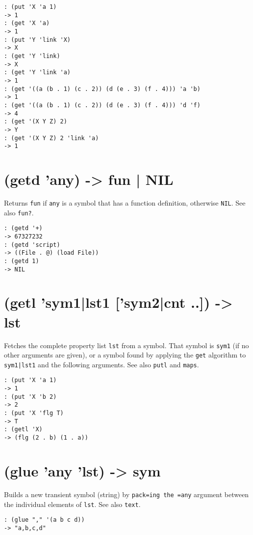 {{{{{{\begin{verbatim}
: (put 'X 'a 1)
-> 1
: (get 'X 'a)
-> 1
: (put 'Y 'link 'X)
-> X
: (get 'Y 'link)
-> X
: (get 'Y 'link 'a)
-> 1
: (get '((a (b . 1) (c . 2)) (d (e . 3) (f . 4))) 'a 'b)
-> 1
: (get '((a (b . 1) (c . 2)) (d (e . 3) (f . 4))) 'd 'f)
-> 4
: (get '(X Y Z) 2)
-> Y
: (get '(X Y Z) 2 'link 'a)
-> 1
\end{verbatim}

 
\section{(getd 'any) -> fun | NIL}
\label{sec-8-1-7-6}


Returns \texttt{fun} if \texttt{any} is a symbol that has a function definition,
otherwise \texttt{NIL}. See also \texttt{fun?}.


\begin{verbatim}
: (getd '+)
-> 67327232
: (getd 'script)
-> ((File . @) (load File))
: (getd 1)
-> NIL
\end{verbatim}

 
\section{(getl 'sym1|lst1 ['sym2|cnt ..]) -> lst}
\label{sec-8-1-7-7}


Fetches the complete property list \texttt{lst} from a symbol. That symbol is
\texttt{sym1} (if no other arguments are given), or a symbol found by applying
the \texttt{get} algorithm to \texttt{sym1|lst1} and the following arguments. See also
\texttt{putl} and \texttt{maps}.


\begin{verbatim}
: (put 'X 'a 1)
-> 1
: (put 'X 'b 2)
-> 2
: (put 'X 'flg T)
-> T
: (getl 'X)
-> (flg (2 . b) (1 . a))
\end{verbatim}

 
\section{(glue 'any 'lst) -> sym}
\label{sec-8-1-7-8}


Builds a new transient symbol (string) by \texttt{pack=ing the =any} argument
between the individual elements of \texttt{lst}. See also \texttt{text}.


\begin{verbatim}
: (glue "," '(a b c d))
-> "a,b,c,d"
\end{verbatim}

}}}}}}
